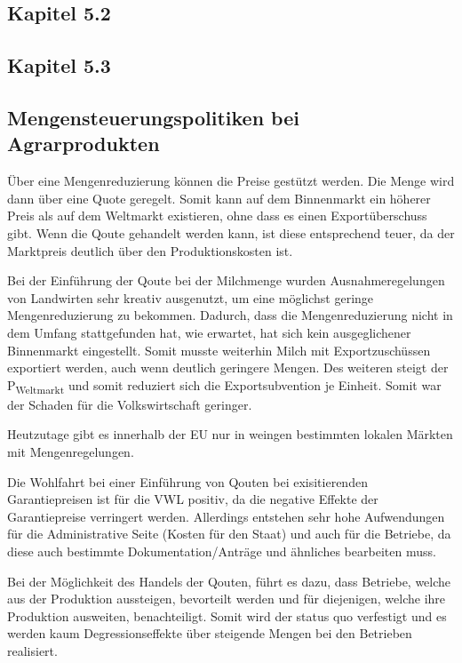 \documentclass[11pt]{scrartcl}
\begin{document}
\subsection{Kapitel 5.2}
\subsection{Kapitel 5.3}
\subsection{Mengensteuerungspolitiken bei Agrarprodukten}

Über eine Mengenreduzierung können die Preise gestützt werden.
Die Menge wird dann über eine Quote geregelt.
Somit kann auf dem Binnenmarkt ein höherer Preis als auf dem Weltmarkt existieren, ohne dass es einen Exportüberschuss gibt.
Wenn die Qoute gehandelt werden kann, ist diese entsprechend teuer, da der Marktpreis deutlich über den Produktionskosten ist.

Bei der Einführung der Qoute bei der Milchmenge wurden Ausnahmeregelungen von Landwirten sehr kreativ ausgenutzt, um eine möglichst geringe Mengenreduzierung zu bekommen.
Dadurch, dass die Mengenreduzierung nicht in dem Umfang stattgefunden hat, wie erwartet, hat sich kein ausgeglichener Binnenmarkt eingestellt.
Somit musste weiterhin Milch mit Exportzuschüssen exportiert werden, auch wenn deutlich geringere Mengen.
Des weiteren steigt der P\textsubscript{Weltmarkt} und somit reduziert sich die Exportsubvention je Einheit.
Somit war der Schaden für die Volkswirtschaft geringer.

Heutzutage gibt es innerhalb der \ac{EU} nur in weingen bestimmten lokalen Märkten mit Mengenregelungen.

Die Wohlfahrt bei einer Einführung von Qouten bei exisitierenden Garantiepreisen ist für die \ac{VWL} positiv, da die negative Effekte der Garantiepreise verringert werden.
Allerdings entstehen sehr hohe Aufwendungen für die Administrative Seite (Kosten für den Staat) und auch für die Betriebe, da diese auch bestimmte Dokumentation/Anträge und ähnliches bearbeiten muss.

Bei der Möglichkeit des Handels der Qouten, führt es dazu, dass Betriebe, welche aus der Produktion aussteigen, bevorteilt werden und für diejenigen, welche ihre Produktion ausweiten, benachteiligt.
Somit wird der status quo verfestigt und es werden kaum Degressionseffekte über steigende Mengen bei den Betrieben realisiert.


\end{document}
